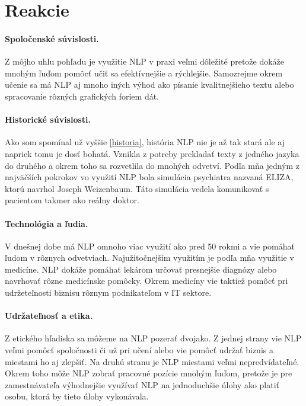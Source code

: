 \documentclass[10pt,slovak,a4paper,twoside]{article}
\begin{document}
\section{Reakcie}\label{reakcie}
\paragraph{Spoločenské súvislosti.}
Z môjho uhlu pohľadu je využitie NLP v praxi veľmi dôležité pretože dokáže mnohým ľuďom pomôcť učiť sa efektívnejšie a rýchlejšie. 
Samozrejme okrem učenie sa má NLP aj mnoho iných výhod ako písanie kvalitnejšieho textu alebo spracovanie rôzných grafických foriem dát.
\paragraph{Historické súvislosti.}
Ako som spomínal už vyššie \ref{historia}, história NLP nie je až tak stará ale aj napriek tomu je dosť bohatá. Vznikla z potreby prekladať
texty z jedného jazyka do druhého a okrem toho sa rozvetlila do mnohých odvetví. Podľa mňa jedným z najväčších pokrokov vo využití NLP bola simulácia psychiatra
nazvaná ELIZA\cite{historia}, ktorú navrhol Joseph Weizenbaum. Táto simulácia vedela komunikovať s pacientom takmer ako reálny doktor.
\paragraph{Technológia a ľudia.}
V dnešnej dobe má NLP omnoho viac využití ako pred 50 rokmi a vie pomáhať ľudom v rôznych odvetviach. Najužitočnejším využitím je podľa mňa využitie v medicíne.
NLP dokáže pomáhať lekárom určovať presnejšie diagnózy alebo navrhovať rôzne medicínske pomôcky. Okrem medicíny vie taktiež pomôcť pri udržeteľnosti biznisu rôznym
podnikateľom v IT sektore.
\paragraph{Udržateľnosť a etika.}
Z etického hľadiska sa môžeme na NLP pozerať dvojako. Z jednej strany vie NLP veľmi pomôcť spoločnosti či už pri učení alebo vie pomôcť udržať biznis a miestami ho aj zlepšiť. Na druhú stranu je 
NLP miestami veľmi nepredvídateľné. Okrem toho môže NLP zobrať pracovné pozície mnohým ľuďom, pretože je pre zamestnávateľa výhodnejšie využívať NLP na jednoduchšie
úlohy ako platiť osobu, ktorá by tieto úlohy vykonávala.

 
\end{document}
